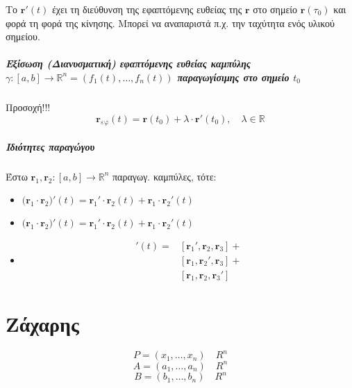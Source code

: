 \documentclass[11pt,a4paper,titlepage,draft]{article}
\begin{document}
Το \( \mathbf r'(t) \) έχει τη διεύθυνση της εφαπτόμενης ευθείας της \( \mathbf r\) στο σημείο \( \mathbf r(τ_0)\) και φορά τη φορά της κίνησης. Μπορεί να αναπαριστά π.χ. την ταχύτητα ενός υλικού σημείου.

\subsubsection{Εξίσωση (Διανυσματική) εφαπτόμενης ευθείας καμπύλης \(\gamma: [a,b] \rightarrow  \mathbb R ^n = \left(f_1(t),\dots,f_n(t) \right)\) παραγωγίσιμης στο σημείο \(t_0\)}

\begin{attnbox}{Προσοχή!!!}
\[
 \mathbf r_{\text{εφ}}(t) =  \mathbf r(t_0) + \lambda \cdot  \mathbf r'(t_0), \quad \lambda \in  \mathbb R 
 \]
 \end{attnbox}
 
\subsubsection{Ιδιότητες παραγώγου}
Έστω \( \mathbf r_1, \mathbf r_2:[a,b] \rightarrow  \mathbb R ^n\) παραγωγ. καμπύλες, τότε:

\begin{itemize}
\item \( \big( \mathbf r_1 \cdot  \mathbf r_2 \big) ' (t) =
 \mathbf r_1' \cdot  \mathbf r_2(t) +  \mathbf r_1 \cdot  \mathbf r_2'(t)
 \) %
\item \( \big( \mathbf r_1 \cdot  \mathbf r_2 \big) ' (t) =
 \mathbf r_1' \cdot  \mathbf r_2(t) +  \mathbf r_1 \cdot  \mathbf r_2'(t)
 \)
 \item \begin{align*} 
 [ \mathbf r_1, \mathbf r_2, \mathbf r_3 ]'(t) = 
 &[ \mathbf r_1', \mathbf r_2, \mathbf r_3 ] + \\
 &[ \mathbf r_1, \mathbf r_2',\mathbf r_3 ] + \\
 &[ \mathbf r_1, \mathbf r_2, \mathbf r_3' ]
\end{align*}
\end{itemize}

\part{Ζάχαρης}


\[P = (x_1,\dots,x_n)  \mathbb \quad R ^n\]
\[A = (a_1,\dots,a_n)  \mathbb \quad R ^n\]
\[B = (b_1,\dots,b_n)  \mathbb \quad R ^n\]
\end{document}
